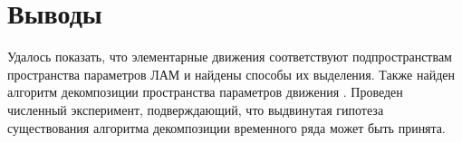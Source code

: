 \documentclass[12pt, fleqn, unicode]{article}
\newcommand{\R}{\mathbb{R}}
\newcommand{\brs}[1]{\left(#1\right)}
\newcommand{\sbrs}[1]{\left[#1\right]}
\begin{document}
\section{Выводы}

Удалось показать, что элементарные движения соответствуют подпространствам пространства параметров ЛАМ и найдены способы их выделения. Также найден алгоритм декомпозиции пространства параметров движения .
Проведен численный эксперимент, подверждающий, что выдвинутая гипотеза существования алгоритма декомпозиции временного ряда может быть принята.  


\newpage
\nocite{*}\







\end{document}
